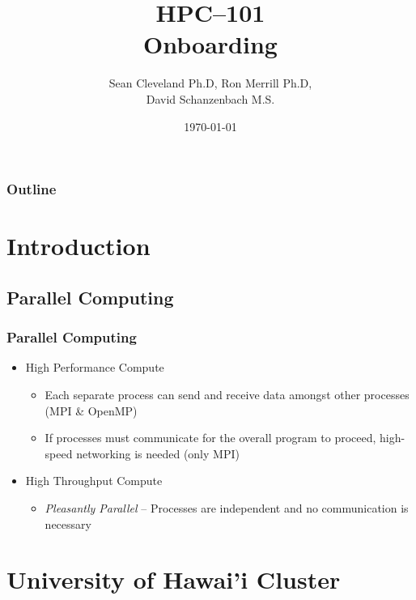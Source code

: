\documentclass[t,hyperref={pdfpagelabels=false}]{beamer}
\title[HPC--101]{HPC--101\\Onboarding} %
\author{Sean Cleveland Ph.D, Ron Merrill Ph.D,\\David Schanzenbach M.S.} %
\institute[University of {\hawaii} -- ITS--CI] %
{
Information Technology Services \\
{\ci} \\
University of {\hawaii} \\ %
\medskip
\textbf{\url{https://www.hawaii.edu/its/ci/}}\\
\textbf{\textit{uh-hpc-help@lists.hawaii.edu}} %
}
\date{\today} %
\begin{document}
\begin{frame}
\titlepage %
\end{frame}

\begin{frame}
\frametitle{Outline} %
\tableofcontents[hideallsubsections] %
\end{frame}

\section{Introduction}

\subsection{Parallel Computing}
\begin{frame}
	\frametitle{Parallel Computing}
	\begin{itemize}
		\item High Performance Compute
		\begin{itemize}
			\item Each separate process can send and receive data amongst other processes (MPI \& OpenMP)
			\item If processes must communicate for the overall program to proceed, high-speed networking is needed (only MPI)
		\end{itemize}
		\item High Throughput Compute
		\begin{itemize}
			\item \emph{Pleasantly Parallel} -- Processes are independent and no communication is necessary 
		\end{itemize}
	\end{itemize}
\end{frame}


\section{University of Hawai'i Cluster}
\end{document}
